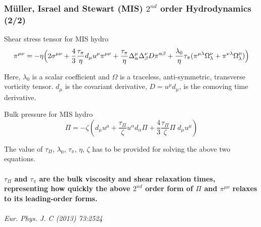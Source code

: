 \documentclass[aspectratio=1610]{beamer}
\begin{document}



\begin{frame}
\frametitle{Müller, Israel and Stewart (MIS) $2^{nd}$ order Hydrodynamics (2/2)}



\begin{block}{Shear stress tensor for MIS hydro}
\begin{equation}
\pi^{\mu\nu} = -\eta \Bigl( 2\sigma^{\mu\nu} + \frac{4}{3} \frac{\tau_\pi}{\eta} d_\mu u^\mu \pi^{\mu\nu} + \frac{\tau_\pi}{\eta} \Delta^\mu_\alpha \Delta^\nu_\beta D \pi^{\alpha\beta}  \nonumber +  \frac{\lambda_0}{\eta} \tau_\pi ( \pi^{\mu\lambda} \Omega^\nu_\lambda + \pi^{\nu\lambda} \Omega^\mu_\lambda ) \Bigr)
\end{equation}
\end{block}

Here, $\lambda_0$ is a scalar coefficient and $\Omega$ is a traceless, anti-symmetric, transverse vorticity tensor. 
$d_\mu$ is the covariant derivative,  $D = u^\mu d_\mu$, is the comoving time derivative.

\begin{block}{Bulk pressure for MIS hydro}
\begin{equation}
\Pi = -\zeta \left( d_\mu u^\mu + \frac{\tau_\Pi}{\zeta} u^\alpha d_\alpha \Pi + \frac{4}{3} \frac{\tau_\Pi}{\zeta} \Pi \; d_\mu u^\mu \right)
\end{equation}
\end{block}

The value of $\tau_\Pi$, $\lambda_0$, $\tau_\pi$, $\eta$, $\zeta$ has to be provided for solving the above two equations.\\~\\

\textbf{$\tau_\Pi$ and $\tau_\pi$ are the bulk viscosity and shear relaxation times, representing how quickly the above $2^{nd}$ order form of $\Pi$ and $\pi^{\mu\nu}$ relaxes to its leading-order forms.} \\~\\

\textit{Eur. Phys. J. C (2013) 73:2524} \\

\end{frame}
\end{document}
